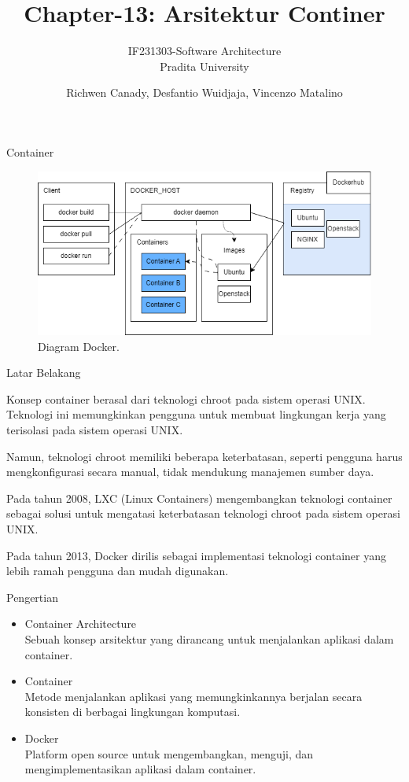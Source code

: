 \documentclass{beamer}
\title{Chapter-13: Arsitektur Continer}
\subtitle{IF231303-Software Architecture\\Pradita University}
\author{Richwen Canady, Desfantio Wuidjaja, Vincenzo Matalino}
\begin{document}
	
	\begin{frame}[plain]
		\maketitle
	\end{frame}
	
	\begin{frame}{Container}
		\begin{figure}[h]
			\centering
			\includegraphics[width=\textwidth]{DockerDiagram.png}
			\caption{Diagram Docker.}
			\label{fig:ContainerDiagram}
		\end{figure}
	\end{frame}
	
	\begin{frame}{Latar Belakang}
                \item Konsep container berasal dari teknologi chroot pada sistem operasi UNIX. Teknologi ini memungkinkan pengguna untuk membuat lingkungan kerja yang terisolasi pada sistem operasi UNIX.
                \item Namun, teknologi chroot memiliki beberapa keterbatasan, seperti pengguna harus mengkonfigurasi secara manual, tidak mendukung manajemen sumber daya.
                \item Pada tahun 2008, LXC (Linux Containers) mengembangkan teknologi container sebagai solusi untuk mengatasi keterbatasan teknologi chroot pada sistem operasi UNIX.
                \item Pada tahun 2013, Docker dirilis sebagai implementasi teknologi container yang lebih ramah pengguna dan mudah digunakan.
	\end{frame}

        \begin{frame}{Pengertian}
		\begin{itemize}
			\item Container Architecture
                \\Sebuah konsep arsitektur yang dirancang untuk menjalankan aplikasi dalam container.
                \item Container
                \\Metode menjalankan aplikasi yang memungkinkannya berjalan secara konsisten di berbagai lingkungan komputasi.
                \item Docker
                \\Platform open source untuk mengembangkan, menguji, dan mengimplementasikan aplikasi dalam container. 
		\end{itemize}
	\end{frame}
	
\end{document}

